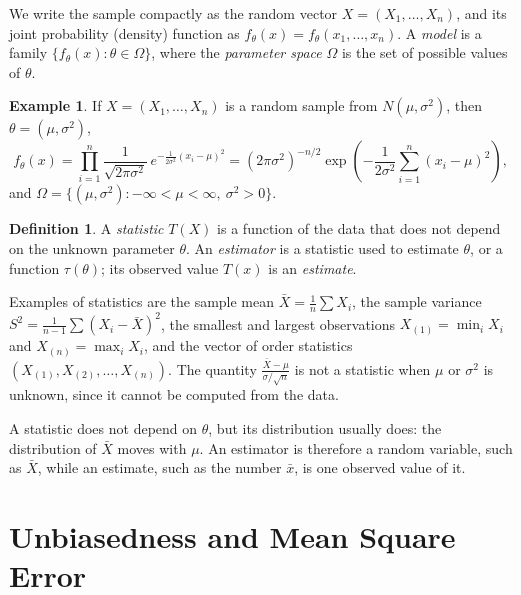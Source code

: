 \documentclass[12pt,a4paper]{report}
\theoremstyle{definition}
\newtheorem{defn}[thm]{Definition}
\newtheorem{exa}[thm]{Example}
\begin{document}
We write the sample compactly as the random vector $X = (X_1, \dots, X_n)$, and its
joint probability (density) function as $f_\theta(x) = f_\theta(x_1, \dots, x_n)$.
A \emph{model} is a family $\{f_\theta(x) : \theta\in\Omega\}$, where the
\emph{parameter space} $\Omega$ is the set of possible values of $\theta$.

\begin{exa}
\label{ex:normalmodel}
If $X = (X_1, \dots, X_n)$ is a random sample from $N(\mu, \sigma^2)$, then
$\theta = (\mu, \sigma^2)$,
\[f_\theta(x) = \prod^n_{i = 1} \frac{1}{\sqrt{2\pi \sigma^2}}\,
e^{-\frac{1}{2\sigma^2}(x_i - \mu)^2}
= (2\pi\sigma^2)^{-n/2}\exp\left(-\frac{1}{2\sigma^2}\sum_{i=1}^n (x_i - \mu)^2\right),\]
and $\Omega = \{(\mu, \sigma^2) : -\infty < \mu < \infty,\ \sigma^2 > 0\}$.
\end{exa}

\begin{defn}
\label{def:statistic}
A \emph{statistic} $T(X)$ is a function of the data that does not depend on the
unknown parameter $\theta$. An \emph{estimator} is a statistic used to estimate
$\theta$, or a function $\tau(\theta)$; its observed value $T(x)$ is an
\emph{estimate}.
\end{defn}

Examples of statistics are the sample mean $\bar X = \frac1n\sum X_i$, the sample
variance $S^2 = \frac{1}{n-1}\sum (X_i - \bar X)^2$, the smallest and largest
observations $X_{(1)} = \min_i X_i$ and $X_{(n)} = \max_i X_i$, and the vector of
order statistics $(X_{(1)}, X_{(2)}, \dots, X_{(n)})$. The quantity
$\frac{\bar X - \mu}{\sigma/\sqrt n}$ is not a statistic when $\mu$ or $\sigma^2$
is unknown, since it cannot be computed from the data.

A statistic does not depend on $\theta$, but its distribution usually does: the
distribution of $\bar X$ moves with $\mu$. An estimator is therefore a random
variable, such as $\bar X$, while an estimate, such as the number $\bar x$, is one
observed value of it.

\section{Unbiasedness and Mean Square Error}
\end{document}
